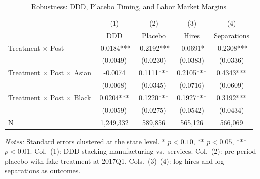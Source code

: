 \begin{table}[H]
\centering
\caption{Robustness: DDD, Placebo Timing, and Labor Market Margins}
\label{tab:robustness}
\begin{threeparttable}
\begin{tabular}{lcccc}
\toprule
 & (1) & (2) & (3) & (4) \\
 & DDD & Placebo & Hires & Separations \\
\midrule
Treatment $\times$ Post & -0.0184*** & -0.2192*** & -0.0691* & -0.2308*** \\
 & (0.0049) & (0.0230) & (0.0383) & (0.0336) \\[3pt]
Treatment $\times$ Post $\times$ Asian & -0.0074 & 0.1111*** & 0.2105*** & 0.4343*** \\
 & (0.0068) & (0.0345) & (0.0716) & (0.0609) \\[3pt]
Treatment $\times$ Post $\times$ Black & 0.0204*** & 0.1220*** & 0.1927*** & 0.3192*** \\
 & (0.0059) & (0.0275) & (0.0542) & (0.0434) \\[3pt]
\midrule
N & 1,249,332 & 589,856 & 565,126 & 566,069 \\
\bottomrule
\end{tabular}
\begin{tablenotes}[flushleft]
\small
\item \textit{Notes:} Standard errors clustered at the state level. * $p<0.10$, ** $p<0.05$, *** $p<0.01$. Col.\ (1): DDD stacking manufacturing vs.\ services. Col.\ (2): pre-period placebo with fake treatment at 2017Q1. Cols.\ (3)--(4): log hires and log separations as outcomes.
\end{tablenotes}
\end{threeparttable}
\end{table}

